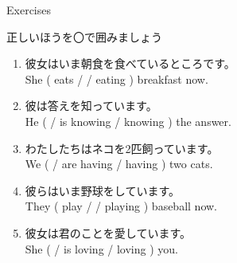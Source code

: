 \documentclass[aspectratio=169,xcolor={dvipsnames,table}]{beamer}
\newcommand{\myaudio}[1]{\href{#1}{\faVolumeUp}}
\begin{document}
\begin{frame}[plain]{Exercises}
 
正しいほうを〇で囲みましょう

\begin{enumerate}
 \item 彼女はいま朝食を食べているところです。\\
She ( eats /  / eating ) breakfast now.
 \item 彼は答えを知っています。\\
He (  / is knowing / knowing ) the answer.
 \item わたしたちはネコを2匹飼っています。\\
We (  / are having / having ) two cats.
 \item 彼らはいま野球をしています。\\
They ( play / / playing ) baseball now.
 \item 彼女は君のことを愛しています。\\
She (  / is loving / loving ) you.
\end{enumerate}

\hfill{}

%
\mbox{}\hfill\myaudio{./audio/021_is_ing_intro_05.mp3}

\end{frame}
\end{document}
